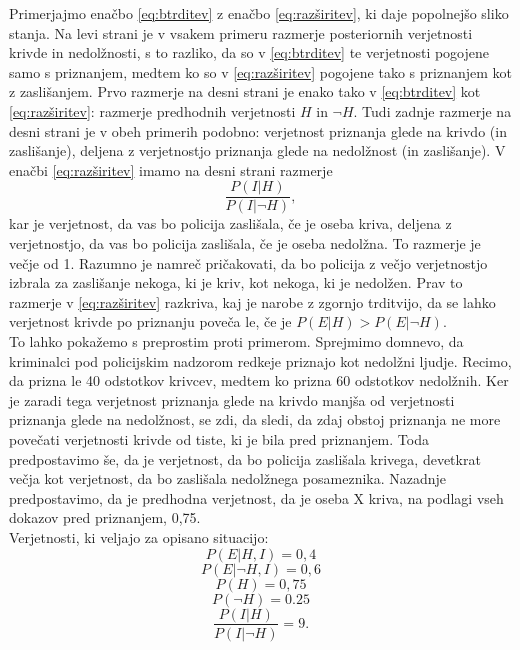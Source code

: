 \documentclass[fin1, tisk]{fmfdelo}
\theoremstyle{definition}
\theoremstyle{trditev}
\theoremstyle{izrek}
\begin{document}
Primerjajmo enačbo \eqref{eq:btrditev} z enačbo \eqref{eq:razširitev}, ki daje popolnejšo sliko stanja. Na levi strani je v vsakem primeru razmerje posteriornih verjetnosti krivde in nedolžnosti, s to 
razliko, da so v \eqref{eq:btrditev} te verjetnosti pogojene samo s priznanjem, medtem ko so v \eqref{eq:razširitev} pogojene tako s priznanjem kot z zaslišanjem. Prvo razmerje na desni strani je enako 
tako v \eqref{eq:btrditev} kot \eqref{eq:razširitev}: razmerje predhodnih verjetnosti $H$ in $\neg H$. Tudi zadnje razmerje na desni strani je v obeh primerih podobno: verjetnost priznanja glede na 
krivdo (in zaslišanje), deljena z verjetnostjo priznanja glede na nedolžnost (in zaslišanje). V enačbi \eqref{eq:razširitev} imamo na desni strani razmerje 
\[\frac{P(I \lvert H)}{P(I \lvert \neg H)},\] kar je verjetnost, da vas bo policija zaslišala, če je oseba kriva, deljena z verjetnostjo, da vas bo policija 
zaslišala, če je oseba nedolžna. To razmerje je večje od 1. Razumno je namreč pričakovati, da bo policija z večjo verjetnostjo izbrala za zaslišanje nekoga, 
ki je kriv, kot nekoga, ki je nedolžen. Prav to razmerje v \eqref{eq:razširitev} razkriva, kaj je narobe z zgornjo trditvijo, da se lahko verjetnost krivde po priznanju poveča le, 
če je $P(E \lvert H) > P(E \lvert \neg H)$. \\
To lahko pokažemo s preprostim proti primerom. Sprejmimo domnevo, da kriminalci pod policijskim nadzorom redkeje priznajo kot nedolžni ljudje. Recimo, da prizna 
le 40 odstotkov krivcev, medtem ko prizna 60 odstotkov nedolžnih. Ker je zaradi tega verjetnost priznanja glede na krivdo manjša od verjetnosti priznanja glede 
na nedolžnost, se zdi, da sledi, da zdaj obstoj priznanja ne more povečati verjetnosti krivde od tiste, ki je bila pred priznanjem. Toda predpostavimo še, 
da je verjetnost, da bo policija zaslišala krivega, devetkrat večja kot verjetnost, da bo zaslišala nedolžnega posameznika. Nazadnje predpostavimo, da je 
predhodna verjetnost, da je oseba X kriva, na podlagi vseh dokazov pred priznanjem, 0,75. \\
Verjetnosti, ki veljajo za opisano situacijo:\\ \vspace{2mm}
\[P(E \lvert H, I)  = 0,4  \]
\[P(E \lvert \neg H, I) = 0,6  \]
\[P(H) = 0,75  \]
\[P(\neg H) = 0.25  \]
\[\frac{P(I \lvert H)}{P(I \lvert \neg H)} = 9. \]
\end{document}
